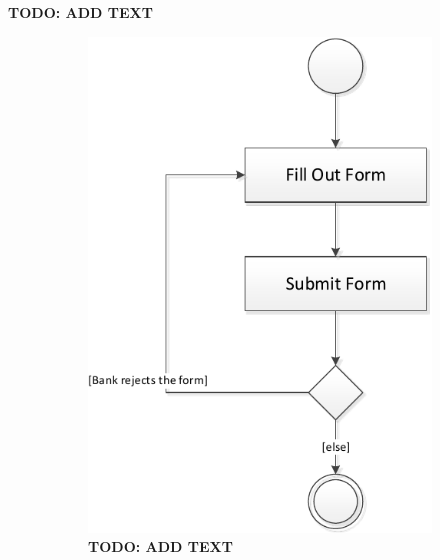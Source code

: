 \textbf{TODO: ADD TEXT}

\begin{figure} 
	\centering
	\begin{subfigure}[b]{0.3\textwidth}
	\includegraphics[width=\textwidth]{img/activity_diagrams/Buy_toll_tag}
	\caption{\textbf{TODO: ADD TEXT}}
	\end{subfigure}
	~
	\begin{subfigure}[b]{0.5\textwidth}

\end{subfigure}
\end{figure}

